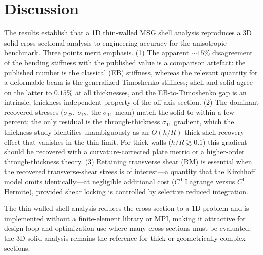 \documentclass[preprint,12pt]{elsarticle}
\newcommand{\hR}{h/R}
\begin{document}
\section{Discussion}
The results establish that a 1D thin-walled MSG shell analysis reproduces a 3D
solid cross-sectional analysis to engineering accuracy for the anisotropic
benchmark. Three points merit emphasis. (1) The apparent $\sim15\%$ disagreement
of the bending stiffness with the published value is a comparison artefact: the
published number is the classical (EB) stiffness, whereas the relevant quantity
for a deformable beam is the generalized Timoshenko stiffness; shell and solid
agree on the latter to $0.15\%$ at all thicknesses, and the EB-to-Timoshenko
gap is an intrinsic, thickness-independent property of the off-axis section.
(2) The dominant recovered stresses ($\sigma_{22}$, $\sigma_{12}$, the
$\sigma_{11}$ mean) match the solid to within a few percent; the only residual
is the through-thickness $\sigma_{11}$ gradient, which the thickness study
identifies unambiguously as an $O(\hR)$ thick-shell recovery effect that
vanishes in the thin limit. For thick walls ($\hR\gtrsim0.1$) this gradient
should be recovered with a curvature-corrected plate metric or a higher-order
through-thickness theory. (3) Retaining transverse shear (RM) is essential when
the recovered transverse-shear stress is of interest---a quantity that the
Kirchhoff model omits identically---at negligible additional cost
($C^{0}$ Lagrange versus $C^{1}$ Hermite), provided shear locking is controlled
by selective reduced integration.

The thin-walled shell analysis reduces the cross-section to a 1D problem and is
implemented without a finite-element library or MPI, making it attractive for
design-loop and optimization use where many cross-sections must be evaluated;
the 3D solid analysis remains the reference for thick or geometrically complex
sections.

\end{document}
